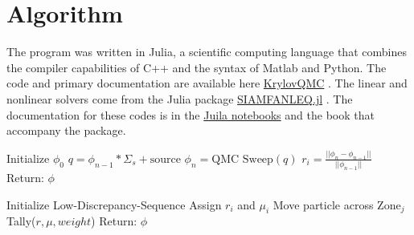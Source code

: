 \section{Algorithm}
\label{sec:algorithm}




The program was written in Julia, a scientific computing language that combines the compiler capabilities of C++ and the syntax of Matlab and Python. The code and primary documentation are available here \href{https://github.com/ctkelley/Krylov_QMC} {Krylov\textunderscore QMC} \cite{ctk:krylovqmc}. The linear and nonlinear solvers come from the Julia package \href{https://github.com/ctkelley/SIAMFANLEquations.jl}{SIAMFANLEQ.jl} \cite{ctk:siamfanl}. The documentation for these codes is in the \href{https://github.com/ctkelley NotebookSIAMFANL}{Juila notebooks} \cite{ctk:notebooknl} and the book \cite{ctk:fajulia} that accompany the package. 

\noindent\begin{minipage}{\textwidth}
\begin{minipage}{0.45\textwidth}
		\centering
		\label{alg:SI}
		\begin{algorithmic}[1]
		\STATE Initialize $\phi_0$
			\STATE $q = \phi_{n-1}*\Sigma_{s} + \textrm{source}$
			\STATE $\phi_n = \mbox{QMC Sweep}(q)$
			\STATE $r_{i} = \frac{||\phi_n - \phi_{n-1}||}{||\phi_{n-1}||}$
		\ENDWHILE
		\STATE Return: $\phi$
	\end{algorithmic} 
\end{minipage}
\hfill
\begin{minipage}{0.45\textwidth}
	\centering
	 \label{alg:qmc_sweep}
	\begin{algorithmic}[1]
		\STATE Initialize Low-Discrepancy-Sequence
			\STATE Assign $r_i$ and $\mu_i$
				\STATE Move particle across $\textrm{Zone}_j$
				\STATE Tally($r, \mu, weight$)
			\ENDFOR
		\ENDFOR
		\STATE Return: $\phi$
	\end{algorithmic} 
\end{minipage}
\end{minipage}



